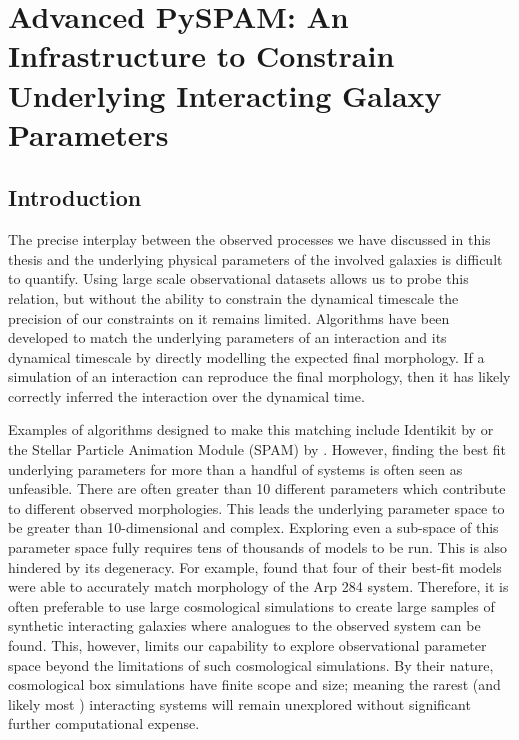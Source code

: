 \chapter{Advanced PySPAM: An Infrastructure to Constrain Underlying Interacting Galaxy Parameters}\label{chapter4}
\section{Introduction}\label{Introduction}
\noindent The precise interplay between the observed processes we have discussed in this thesis and the underlying physical parameters of the involved galaxies is difficult to quantify. Using large scale observational datasets allows us to probe this relation, but without the ability to constrain the dynamical timescale the precision of our constraints on it remains limited. Algorithms have been developed to match the underlying parameters of an interaction and its dynamical timescale by directly modelling the expected final morphology. If a simulation of an interaction can reproduce the final morphology, then it has likely correctly inferred the interaction over the dynamical time.

Examples of algorithms designed to make this matching include Identikit by \citet{2009AJ....137.3071B} or the Stellar Particle Animation Module (SPAM) by \citet{1990AJ....100.1477W}. However, finding the best fit underlying parameters for more than a handful of systems is often seen as unfeasible. There are often greater than 10 different parameters which contribute to different observed morphologies. This leads the underlying parameter space to be greater than 10-dimensional and complex. Exploring even a sub-space of this parameter space fully requires tens of thousands of models to be run. This is also hindered by its degeneracy. For example, \citet{2010ASPC..423..227S} found that four of their best-fit models were able to accurately match morphology of the Arp 284 system. Therefore, it is often preferable to use large cosmological simulations \citep[e.g.][]{2015MNRAS.446..521S, 2018MNRAS.480..800H, 2020MNRAS.493.3716H} to create large samples of synthetic interacting galaxies where analogues to the observed system can be found. This, however, limits our capability to explore observational parameter space beyond the limitations of such cosmological simulations. By their nature, cosmological box simulations have finite scope and size; meaning the rarest (and likely most \DIFdelbegin {}\DIFdelend \DIFaddbegin {}\DIFaddend ) interacting systems will remain unexplored without significant further computational expense.

